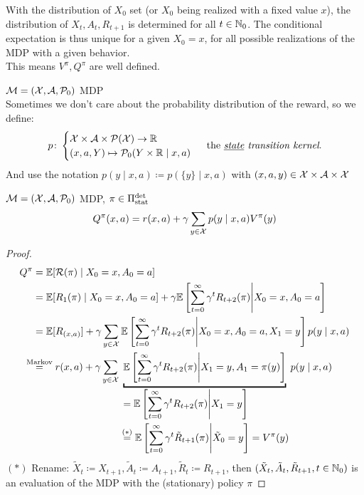 \begin{remark}
With the distribution of \(X_0\) set (or \(X_0\) being realized with a fixed value \(x\)), the distribution of \(X_t, A_t,R_{t+1}\) is determined for all \(t\in\mathbb{N}_0\). The conditional expectation is thus unique for a given \(X_0=x\), for all possible realizations of the MDP with a given behavior. \\
This means \(V^\pi, Q^\pi\) are well defined.
\end{remark}


\begin{definition}\(\mathcal{M}=(\mathcal{X},\mathcal{A},\mathcal{P}_0)\) MDP\\
Sometimes we don't care about the probability distribution of the reward, so we define:
	\[
	p\colon 
	\begin{cases}
		\mathcal{X}\times\mathcal{A}\times\mathcal{P}(\mathcal{X})\to\mathbb{R}\\
		(x,a,Y)\mapsto \mathcal{P}_0(Y\times\mathbb{R}\mid x,a)
	\end{cases}\text{ the \emph{\underline{state} transition kernel}.}
	\] 
And use the notation \(p(y\mid x,a)\coloneqq p(\{y\}\mid x,a)\) with \((x,a,y)\in\mathcal{X}\times\mathcal{A}\times\mathcal{X}\)
\end{definition}


\begin{prop}\label{expand Q^pi}\(\mathcal{M}=(\mathcal{X},\mathcal{A},\mathcal{P}_0)\) MDP, \(\pi\in\Pi_{\textnormal{stat}}^{\textnormal{det}}\) 
	\[Q^\pi(x,a)=r(x,a)+\gamma\sum_{y\in\mathcal{X}}p(y\mid x,a)V^\pi(y)	\]
\end{prop}

\begin{proof}
\begin{align*}
Q^\pi &= \E[\cR(\pi)\mid X_0=x, A_0=a]\\
&=\E[R_1(\pi)\mid X_0=x,A_0=a]+\gamma\E\left[\sum_{t=0}^\infty\gamma^t R_{t+2}(\pi)\middle| X_0=x,A_0=a\right]\\
&=\E[R_{(x,a)}] 
 + \gamma \sum_{y\in\cX}\E\left[\sum_{t=0}^\infty\gamma^t R_{t+2}(\pi) \middle| X_0=x,A_0=a, X_1=y\right]p(y\mid x, a)\\
&\lxeq{\text{Markov}} r(x,a)
 + \gamma\sum_{y\in\cX}\underbracket{\E\left[\sum_{t=0}^\infty\gamma^t R_{t+2}(\pi)\middle| X_1=y, A_1=\pi(y)\right]}_{
 \begin{aligned}
 	&= \E\left[\sum_{t=0}^\infty\gamma^t R_{t+2}(\pi)\middle| X_1=y \right] \\
 	&\lxeq{(*)} \E\left[\sum_{t=0}^\infty\gamma^t \tilde{R}_{t+1}(\pi)\middle| \tilde{X}_0=y \right]=V^\pi(y)
 \end{aligned}
 }
 p(y\mid x, a)
\end{align*}
\((*)\) Rename: \(\tilde{X}_{t}\coloneqq X_{t+1}, \tilde{A}_t\coloneqq A_{t+1},\tilde{R}_{t}\coloneqq R_{t+1}\), then \((\tilde{X}_t,\tilde{A}_t,\tilde{R}_{t+1}, t\in\mathbb{N}_0)\) is an evaluation of the MDP with the (stationary) policy \(\pi\)
\end{proof}


